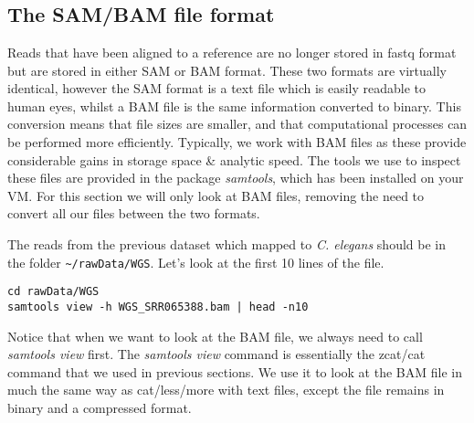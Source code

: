 
\chapter{\moduleTitle}
\newpage

\section{The SAM/BAM file format}
\begin{information}
Reads that have been aligned to a reference are no longer stored in fastq format but are stored in either SAM or BAM format.
These two formats are virtually identical, however the SAM format is a text file which is easily readable to human eyes, whilst a BAM file is the same information converted to binary.
This conversion means that file sizes are smaller, and that computational processes can be performed more efficiently.
Typically, we work with BAM files as these provide considerable gains in storage space \& analytic speed.
The tools we use to inspect these files are provided in the package \textit{samtools}, which has been installed on your VM.
For this section we will only look at BAM files, removing the need to convert all our files between the two formats. \\
\end{information}

\begin{steps}
The reads from the previous dataset which mapped to \textit{C. elegans} should be in the folder \texttt{\~{}/rawData/WGS}.
Let's look at the first 10 lines of the file.
\begin{lstlisting}
cd rawData/WGS
samtools view -h WGS_SRR065388.bam | head -n10
\end{lstlisting}
\end{steps}

\begin{note}
Notice that when we want to look at the BAM file, we always need to call \textit{samtools view} first.
The \textit{samtools view} command is essentially the zcat/cat command that we used in previous sections.
We use it to look at the BAM file in much the same way as cat/less/more with text files, except the file remains in binary and a compressed format.
\end{note}

